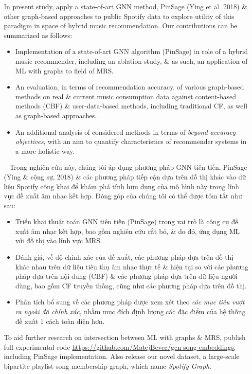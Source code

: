 \documentclass{article}
\begin{document}
\begin{itemize}
    In present study, apply a state-of-art GNN method, PinSage (Ying et al. 2018) \& other graph-based approaches to public Spotify data to explore utility of this paradigm in space of hybrid music recommendation. Our contributions can be summarized as follows:
    \begin{itemize}
        \item Implementation of a state-of-art GNN algorithm (PinSage) in role of a hybrid music recommender, including an ablation study, \& as such, an application of ML with graphs to field of MRS.
        \item An evaluation, in terms of recommendation accuracy, of various graph-based methods on real \& current music consumption data against content-based methods (CBF) \& user-data-based methods, including traditional CF, as well as graph-based approaches.
        \item An additional analysis of considered methods in terms of {\it beyond-accuracy objectives}, with an aim to quantify characteristics of recommender systems in a more holistic way.
    \end{itemize}
    -- Trong nghiên cứu này, chúng tôi áp dụng phương pháp GNN tiên tiến, PinSage (Ying \& cộng sự, 2018) \& các phương pháp tiếp cận dựa trên đồ thị khác vào dữ liệu Spotify công khai để khám phá tính hữu dụng của mô hình này trong lĩnh vực đề xuất âm nhạc kết hợp. Đóng góp của chúng tôi có thể được tóm tắt như sau:
    \begin{itemize}
        \item Triển khai thuật toán GNN tiên tiến (PinSage) trong vai trò là công cụ đề xuất âm nhạc kết hợp, bao gồm nghiên cứu cắt bỏ, \& do đó, ứng dụng ML với đồ thị vào lĩnh vực MRS.
        \item Đánh giá, về độ chính xác của đề xuất, các phương pháp dựa trên đồ thị khác nhau trên dữ liệu tiêu thụ âm nhạc thực tế \& hiện tại so với các phương pháp dựa trên nội dung (CBF) \& các phương pháp dựa trên dữ liệu người dùng, bao gồm CF truyền thống, cũng như các phương pháp dựa trên đồ thị.
        \item Phân tích bổ sung về các phương pháp được xem xét theo {\it các mục tiêu vượt ra ngoài độ chính xác}, nhằm mục đích định lượng các đặc điểm của hệ thống đề xuất 1 cách toàn diện hơn.
    \end{itemize}
    To aid further research on intersection between ML with graphs \& MRS, publish full experimental code \url{https://github.com/MatejBevec/gcn-song-embeddings}, including PinSage implementation. Also release our novel dataset, a large-scale bipartite playlist-song membership graph, which name {\it Spotify Graph}.


\end{itemize}
\end{document}
